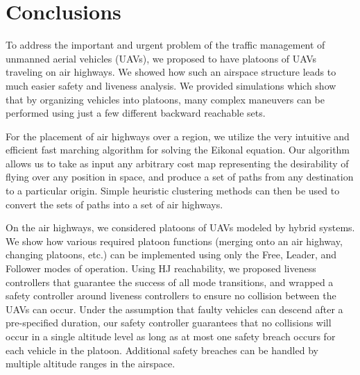 \section{Conclusions}
To address the important and urgent problem of the traffic management of unmanned aerial vehicles (UAVs), we proposed to have platoons of UAVs traveling on air highways. We showed how such an airspace structure leads to much easier safety and liveness analysis. We provided simulations which show that by organizing vehicles into platoons, many complex maneuvers can be performed using just a few different backward reachable sets.

For the placement of air highways over a region, we utilize the very intuitive and efficient fast marching algorithm for solving the Eikonal equation. Our algorithm allows us to take as input any arbitrary cost map representing the desirability of flying over any position in space, and produce a set of paths from any destination to a particular origin. Simple heuristic clustering methods can then be used to convert the sets of paths into a set of air highways.

On the air highways, we considered platoons of UAVs modeled by hybrid systems. We show how various required platoon functions (merging onto an air highway, changing platoons, etc.) can be implemented using only the Free, Leader, and Follower modes of operation. Using HJ reachability, we proposed liveness controllers that guarantee the success of all mode transitions, and wrapped a safety controller around liveness controllers to ensure no collision between the UAVs can occur. Under the assumption that faulty vehicles can descend after a pre-specified duration, our safety controller guarantees that no collisions will occur in a single altitude level as long as at most one safety breach occurs for each vehicle in the platoon. Additional safety breaches can be handled by multiple altitude ranges in the airspace. 

